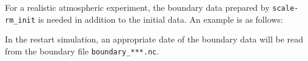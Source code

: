 For a realistic atmospheric experiment, the boundary data prepared by \verb|scale-rm_init|
is needed in addition to the initial data. An example is as follows:


In the restart simulation, an appropriate date of the boundary data will be read from the boundary file \verb|boundary_***.nc|.
